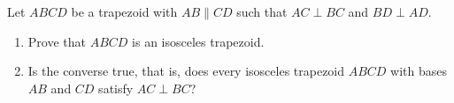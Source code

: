 Let $ABCD$ be a trapezoid with $AB\parallel CD$ such that $AC\perp BC$ and $BD\perp AD$.
\begin{enumerate}
\item[(a)] Prove that $ABCD$ is an isosceles trapezoid.
\item[(b)] Is the converse true, that is, does every isosceles trapezoid $ABCD$ with bases $AB$ and $CD$ satisfy $AC\perp BC$?
\end{enumerate}
